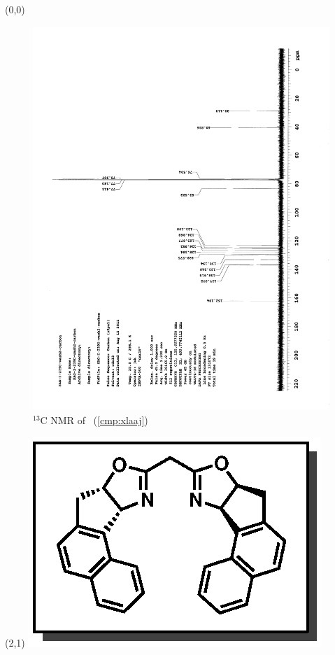 \clearpage
\begin{textblock}{20}(0,0)
\begin{figure}[htb]
\caption{$^{13}$C NMR of  \CMPxlaaj\ (\ref{cmp:xlaaj})}
\includegraphics[scale=0.75, trim = 0mm 0mm 0mm 5mm,
clip]{chp_asymmetric/images/nmr/xlaajC}
\vspace{-100pt}
\end{figure}
\end{textblock}
\begin{textblock}{1}(2,1)
\includegraphics[scale=0.8, angle=90]{chp_asymmetric/images/xlaaj}
\end{textblock}
\clearpage

